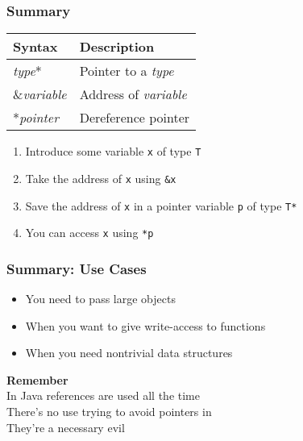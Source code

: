 \begin{frame}
  \frametitle{Summary}
  \begin{center}
    \begin{tabular}{ll}
      \textbf{Syntax}  & \textbf{Description} \\
      \toprule
      {\it type}*      & Pointer to a {\it type} \\
      \&{\it variable} & Address of {\it variable} \\
      *{\it pointer}   & Dereference pointer \\
    \end{tabular}
  \end{center}
  \begin{enumerate}
    \item Introduce some variable \texttt{x} of type \texttt{T}
    \item Take the address of \texttt{x} using \texttt{\&x}
    \item Save the address of \texttt{x} in a pointer variable \texttt{p} of type \texttt{T*}
    \item You can access \texttt{x} using \texttt{*p}
  \end{enumerate}
\end{frame}

\begin{frame}
  \frametitle{Summary: Use Cases}
  \begin{itemize}
    \item You need to pass large objects
    \item When you want to give write-access to functions
    \item When you need nontrivial data structures
  \end{itemize}
  \vskip1cm
  \begin{center}
    \textbf{Remember} \\
    In Java references are used all the time \\
    There's no use trying to avoid pointers in \cpp \\
    They're a necessary evil
  \end{center}
\end{frame}


